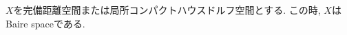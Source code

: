 \begin{tcolorbox}[mybox]
\begin{thm}
$X$を完備距離空間または局所コンパクトハウスドルフ空間とする. 
この時, $X$はBaire spaceである. 
\end{thm}
\end{tcolorbox}


\begin{comment}

結論：
少なくとも一つの \(F_n\) は内部が空でない（内部に開集合を含む）。

言い換え：
- 完備距離空間は「第1類集合（meagre set）」の可算和では覆えない。
- 「第1類集合」とは、内部が空な閉集合の可算和のこと。

\textbf{位相空間論的形}

より一般に：  
\(X\) が局所コンパクトハウスドルフ空間かつ Baire 空間であるなら、任意の可算個の稠密開集合の交わりは稠密である：
\[
\bigcap_{n=1}^\infty U_n \ \text{は稠密}, \quad U_n \ \text{稠密開集合}.
\]
バナッハ空間や完備距離空間は Baire 空間の例。

\textbf{Banach–Steinhaus との関係}  
Banach–Steinhaus（一様有界性原理）は、この Baire の類別定理を使って証明されます。

ざっくり言うと：
1. 点ごとの有界性 \(\Rightarrow\) 「大きさがある閾値を超えない集合」が可算和で \(X\) を覆う。
2. Baire の類別定理により、その中の1つが内部を持つ。
3. 線形性と連続性を使って、内部がある集合の条件が空間全体に広がる。
4. これにより作用素ノルムが一様有界になる。

\section*{全体像}

\subsection*{1. Baireの類別定理（Baire category theorem）}
\textbf{主張}：
完全距離空間（バナッハ空間，フレシェ空間など）はBaire空間．

すなわち：
\begin{itemize}
\item nowhere dense（内部が空な閉集合）の可算和では空間全体を覆えない．
\item 稠密開集合の可算交わりは稠密．
\end{itemize}

\subsection*{2. フレシェ空間は第2類}
\begin{itemize}
\item フレシェ空間は「局所凸＋距離化可能＋完備」な位相ベクトル空間．
\item よって完備距離空間 $\Rightarrow$ Baire空間 $\Rightarrow$ 第1類ではない $\Rightarrow$ 第2類．
\end{itemize}


\end{comment}
